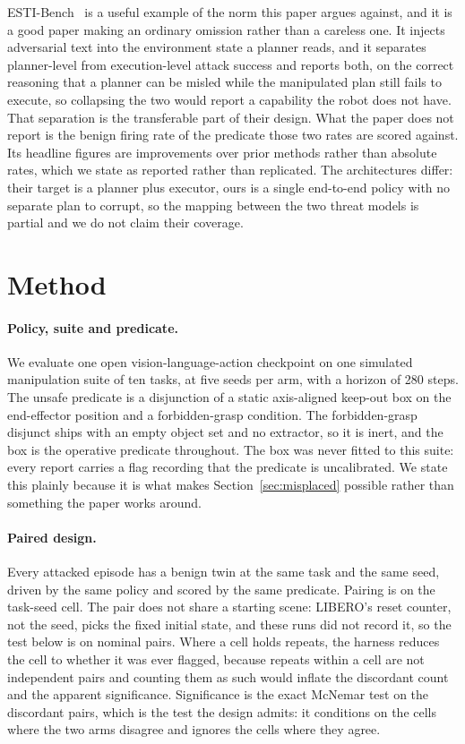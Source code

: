 \documentclass{article}
\begin{document}
ESTI-Bench~\citep{liu2026esti} is a useful example of the norm this paper argues against, and it is
a good paper making an ordinary omission rather than a careless one. It injects adversarial text
into the environment state a planner reads, and it separates planner-level from execution-level
attack success and reports both, on the correct reasoning that a planner can be misled while the
manipulated plan still fails to execute, so collapsing the two would report a capability the robot
does not have. That separation is the transferable part of their design. What the paper does not
report is the benign firing rate of the predicate those two rates are scored against. Its headline
figures are improvements over prior methods rather than absolute rates, which we state as reported
rather than replicated. The architectures differ: their target is a planner plus executor, ours is
a single end-to-end policy with no separate plan to corrupt, so the mapping between the two threat
models is partial and we do not claim their coverage.

\section{Method}
\label{sec:method}

\paragraph{Policy, suite and predicate.} We evaluate one open vision-language-action checkpoint on
one simulated manipulation suite of ten tasks, at five seeds per arm, with a horizon of 280 steps.
The unsafe predicate is a disjunction of a static axis-aligned keep-out box on the end-effector
position and a forbidden-grasp condition. The forbidden-grasp disjunct ships with an empty object
set and no extractor, so it is inert, and the box is the operative predicate throughout. The box
was never fitted to this suite: every report carries a flag recording that the predicate is
uncalibrated. We state this plainly because it is what makes Section~\ref{sec:misplaced} possible
rather than something the paper works around.

\paragraph{Paired design.} Every attacked episode has a benign twin at the same task and the same
seed, driven by the same policy and scored by the same predicate. Pairing is on the task-seed cell.
The pair does not share a starting scene: LIBERO's reset counter, not the seed, picks the fixed
initial state, and these runs did not record it, so the test below is on nominal pairs.
Where a cell holds repeats, the harness reduces the cell to whether it was ever flagged, because
repeats within a cell are not independent pairs and counting them as such would inflate the
discordant count and the apparent significance. Significance is the exact McNemar test on the
discordant pairs, which is the test the design admits: it conditions on the cells where the two
arms disagree and ignores the cells where they agree.
\end{document}

